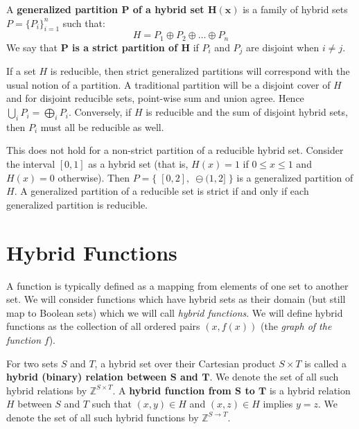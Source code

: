 \begin{definition}
	A \textbf{generalized partition $\boldsymbol{P}$ of a hybrid set $\boldsymbol{H(x)}$} is a family of hybrid sets
	${P=\{P_i \}_{i=1}^n}$ such that:
	\begin{equation}
		H = P_1 \oplus P_2 \oplus \ldots \oplus P_n
	\end{equation}
	We say that \textbf{$\boldsymbol{P}$ is a strict partition of $\boldsymbol{H}$} if 
	$P_i$ and $P_j$ are disjoint when $i \neq j$.
\end{definition}


If a set $H$ is reducible, then strict generalized partitions will correspond with the usual notion of a partition.
A traditional partition will be a disjoint cover of $H$ and for disjoint reducible sets, point-wise sum and union agree.
Hence $\bigcup_i P_i = \bigoplus_i P_i$. 
Conversely, if $H$ is reducible and the sum of disjoint hybrid sets, then $P_i$ must all be reducible as well.


This does not hold for a non-strict partition of a reducible hybrid set.
Consider the interval $[0,1]$ as a hybrid set (that is, $H(x)=1$ if $0 \leq x \leq 1$ and $H(x)=0$ otherwise).
Then $P = \big\{\; [0,2], \;\ominus (1,2] \; \big\}$ is a generalized partition of $H$. 
A generalized partition of a reducible set is strict if and only if each generalized partition is reducible.





\section{Hybrid Functions}
\label{sec:HybridFunction}


A function is typically defined as a mapping from elements of one set to another set.
We will consider functions which have hybrid sets as their domain (but still map to Boolean sets) 
which we will call \emph{hybrid functions}.
We will define hybrid functions as the collection of all ordered pairs $(x,f(x))$ (the \emph{graph of the function} $f$).


\begin{definition}
	For two sets $S$ and $T$, a hybrid set over their Cartesian product $S \times T$ is called a 
	\textbf{hybrid (binary) relation between $\boldsymbol{S}$ and $\boldsymbol{T}$}.
	We denote the set of all such hybrid relations by $\mathbb{Z}^{S \times T}$. 
	A \textbf{hybrid function from $\boldsymbol{S}$ to $\boldsymbol{T}$} is 
	a hybrid relation $H$ between $S$ and $T$ such that $(x,y) \in H$ and $(x,z) \in H$ implies $y=z$.
	We denote the set of all such hybrid functions by $\mathbb{Z}^{S \to T}$.
\end{definition}


